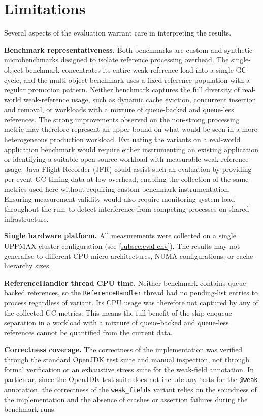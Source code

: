 \section{Limitations}
\label{sec:disc-limits}

Several aspects of the evaluation warrant care in interpreting the results.

\textbf{Benchmark representativeness.} Both benchmarks are custom and synthetic microbenchmarks designed to isolate reference processing overhead. The single-object benchmark concentrates its entire weak-reference load into a single \ac{GC} cycle, and the multi-object benchmark uses a fixed reference population with a regular promotion pattern. Neither benchmark captures the full diversity of real-world weak-reference usage, such as dynamic cache eviction, concurrent insertion and removal, or workloads with a mixture of queue-backed and queue-less references. The strong improvements observed on the non-strong processing metric may therefore represent an upper bound on what would be seen in a more heterogeneous production workload. Evaluating the variants on a real-world application benchmark would require either instrumenting an existing application or identifying a suitable open-source workload with measurable weak-reference usage. Java Flight Recorder (\acs{JFR}) could assist such an evaluation by providing per-event \ac{GC} timing data at low overhead, enabling the collection of the same metrics used here without requiring custom benchmark instrumentation. Ensuring measurement validity would also require monitoring system load throughout the run, to detect interference from competing processes on shared infrastructure.

\textbf{Single hardware platform.} All measurements were collected on a single \ac{UPPMAX} cluster configuration (see \cref{subsec:eval-env}). The results may not generalise to different \ac{CPU} micro-architectures, \ac{NUMA} configurations, or cache hierarchy sizes.

\textbf{ReferenceHandler thread \ac{CPU} time.} Neither benchmark contains queue-backed references, so the \texttt{ReferenceHandler} thread had no pending-list entries to process regardless of variant. Its \ac{CPU} usage was therefore not captured by any of the collected \ac{GC} metrics. This means the full benefit of the skip-enqueue separation in a workload with a mixture of queue-backed and queue-less references cannot be quantified from the current data.

\textbf{Correctness coverage.} The correctness of the implementation was verified through the standard OpenJDK test suite and manual inspection, not through formal verification or an exhaustive stress suite for the weak-field annotation. In particular, since the OpenJDK test suite does not include any tests for the \texttt{@weak} annotation, the correctness of the \texttt{weak\_fields} variant relies on the soundness of the implementation and the absence of crashes or assertion failures during the benchmark runs.


